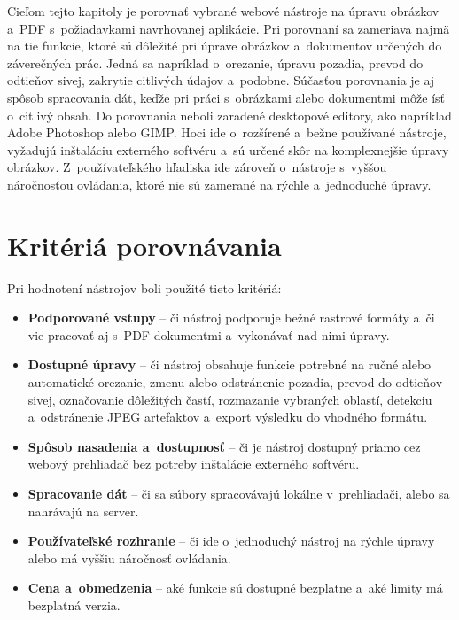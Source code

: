 Cieľom tejto kapitoly je porovnať vybrané webové nástroje na úpravu obrázkov a~PDF s~požiadavkami navrhovanej aplikácie. Pri porovnaní sa zameriava najmä na tie funkcie, ktoré sú dôležité pri úprave obrázkov a~dokumentov určených do záverečných prác. Jedná sa napríklad o~orezanie, úpravu pozadia, prevod do odtieňov sivej, zakrytie citlivých údajov a~podobne. Súčasťou porovnania je aj spôsob spracovania dát, keďže pri práci s~obrázkami alebo dokumentmi môže ísť o~citlivý obsah.
Do porovnania neboli zaradené desktopové editory, ako napríklad Adobe Photoshop alebo GIMP. Hoci ide o~rozšírené a~bežne používané nástroje, vyžadujú inštaláciu externého softvéru a~sú určené skôr na komplexnejšie úpravy obrázkov. Z~používateľského hľadiska ide zároveň o~nástroje s~vyššou náročnosťou ovládania, ktoré nie sú zamerané na rýchle a~jednoduché úpravy.

\section{Kritériá porovnávania}

Pri hodnotení nástrojov boli použité tieto kritériá:

\begin{itemize}
    \item \textbf{Podporované vstupy} -- či nástroj podporuje bežné rastrové formáty a~či vie pracovať aj s~PDF dokumentmi a~vykonávať nad nimi úpravy.
    \item \textbf{Dostupné úpravy} -- či nástroj obsahuje funkcie potrebné na ručné alebo automatické orezanie, zmenu alebo odstránenie pozadia, prevod do odtieňov sivej, označovanie dôležitých častí, rozmazanie vybraných oblastí, detekciu a~odstránenie JPEG artefaktov a~export výsledku do vhodného formátu.
    \item \textbf{Spôsob nasadenia a~dostupnosť} -- či je nástroj dostupný priamo cez webový prehliadač bez potreby inštalácie externého softvéru.
    \item \textbf{Spracovanie dát} -- či sa súbory spracovávajú lokálne v~prehliadači, alebo sa nahrávajú na server.
    \item \textbf{Používateľské rozhranie} -- či ide o~jednoduchý nástroj na rýchle úpravy alebo má vyššiu náročnosť ovládania.
    \item \textbf{Cena a~obmedzenia} -- aké funkcie sú dostupné bezplatne a~aké limity má bezplatná verzia.
\end{itemize}

